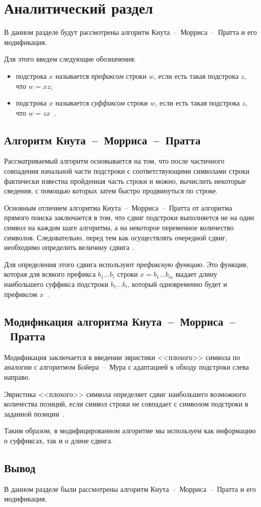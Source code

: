\chapter{Аналитический раздел}
В данном разделе будут рассмотрены алгоритм Кнута~--~Морриса~--~Пратта и его модификация.

Для этого введем следующие обозначения:
\begin{itemize}
	\item подстрока $x$ называется \textit{префиксом} строки $w$, если есть такая подстрока $z$, что $w = xz$;
	
	\item подстрока $x$ называется \textit{суффиксом} строки $w$, если есть такая подстрока $z$, что $w = zx$~\cite{lectures2}.
\end{itemize}

\section{Алгоритм Кнута~--~Морриса~--~Пратта}
Рассматриваемый алгоритм основывается на том, что после частичного совпадения начальной части подстроки с соответствующими символами строки фактически известна пройденная часть строки и можно, вычислить некоторые сведения, с помощью которых затем быстро продвинуться по строке.

Основным отличием алгоритма Кнута~--~Морриса~--~Пратта от алгоритма прямого поиска заключается в том, что сдвиг подстроки выполняется не на один символ на каждом шаге алгоритма, а на некоторое переменное количество символов. 
Следовательно, перед тем как осуществлять очередной сдвиг, необходимо определить величину сдвига~\cite{lectures2}.

Для определения этого сдвига используют \textit{префиксную функцию}. Это функция, которая для всякого префикса $b_1 \dots b_i$ строки $x = b_1 \dots b_m$ выдает длину наибольшего суффикса подстроки $b_1 \dots b_i$, который одновременно будет и префиксом $x$~\cite{lectures1}.

\section{Модификация алгоритма Кнута~--~Морриса~--~Пратта}
Модификация заключается в введении эвристики <<плохого>> символа по аналогии с алгоритмом Бойера~--~Мура с адаптацией к обходу подстроки слева направо.

Эвристика <<плохого>> символа определяет сдвиг наибольшего возможного количества позиций, если символ строки не совпадает с символом подстроки в заданной позиции~\cite{lectures1}.

Таким образом, в модифицированном алгоритме мы используем как информацию о суффиксах, так и о длине сдвига. 

\section*{Вывод}
В данном разделе были рассмотрены алгоритм Кнута~--~Морриса~--~Пратта и его модификация.